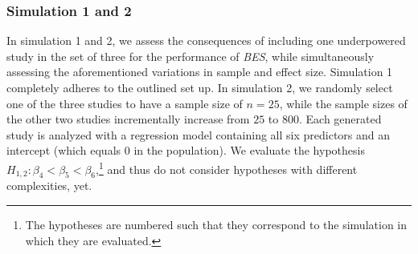 \documentclass[review, 3p, authoryear]{elsarticle} %
\begin{document}
\begin{table}[t]
\centering
\caption{Population-level regression coefficients for ordinary least squares (OLS), logistic and probit regression, given effect sizes of $R^2 \in \{0.02, 0.09, 0.25\}$.} 
\label{tab:coefs}
\end{table}

\hypertarget{simulation-1-and-2}{%
\subsubsection{Simulation 1 and 2}\label{simulation-1-and-2}}

In simulation 1 and 2, we assess the consequences of including one underpowered study in the set of three for the performance of \emph{BES}, while simultaneously assessing the aforementioned variations in sample and effect size.
Simulation 1 completely adheres to the outlined set up.
In simulation 2, we randomly select one of the three studies to have a sample size of \(n = 25\), while the sample sizes of the other two studies incrementally increase from \(25\) to \(800\).
Each generated study is analyzed with a regression model containing all six predictors and an intercept (which equals 0 in the population).
We evaluate the hypothesis \(H_{1,2}: \beta_4 < \beta_5 < \beta_6\),\footnote{
  The hypotheses are numbered such that they correspond to the simulation in which they are evaluated.}
and thus do not consider hypotheses with different complexities, yet.
\end{document}
